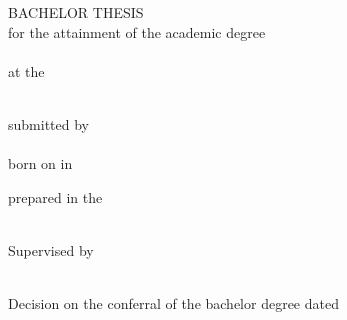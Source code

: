 
\begin{titlepage}
\begin{center}

\null
\vspace{\baselineskip}
{\huge {\bfseries \tTitle \par}}
\vspace{5\baselineskip}
{\large BACHELOR THESIS} \\
\vspace{\baselineskip}
for the attainment of the academic degree \\
\vspace{\baselineskip}
{\large \tDegree} \\
\vspace{\baselineskip}
at the \\ \vspace{.2\baselineskip}{\large International Physics Study Program (IPSP) of the University of Leipzig} \\
\vspace{6\baselineskip}

\vfill

\noindent
submitted by \\
\vspace{.5\baselineskip}
{\bf \tAuthor} \\
\vspace{.25\baselineskip}
born on \tBirthday{} in \tNativeTown \\

\vspace{5\baselineskip}

\noindent
prepared in the \\
\tDepartment \\

\vspace{1.5\baselineskip}

\noindent
Supervised by \\
\vspace{.3\baselineskip}
\tSupervisor \\

\vspace{1.5\baselineskip}

\noindent
Decision on the conferral of the bachelor degree dated \tDefenceDate

\end{center}
\restoregeometry
\end{titlepage}
